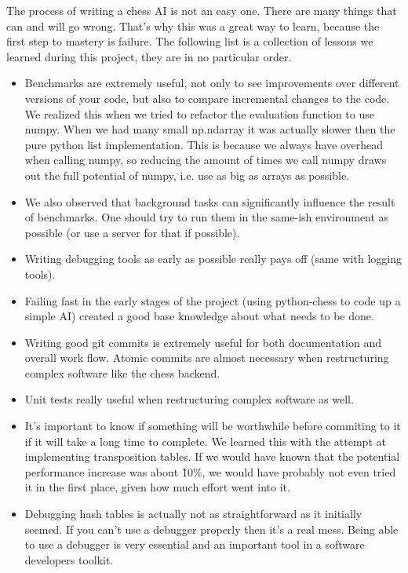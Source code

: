 The process of writing a chess AI is not an easy one.
There are many things that can and will go wrong.
That's why this was a great way to learn,
because the first step to mastery is failure.
The following list is a collection of lessons we learned during
this project, they are in no particular order.

\begin{itemize}
  \item{
Benchmarks are extremely useful,
not only to see improvements over different versions of your code,
but also to compare incremental changes to the code.
We realized this when we tried to refactor the evaluation function to use numpy.
When we had many small np.ndarray it was actually slower then the pure python list implementation.
This is because we always have overhead when calling numpy,
so reducing the amount of times we call numpy draws out the full potential of numpy,
i.e. use as big as arrays as possible.
}
  \item{
We also observed that background tasks can significantly influence the result of benchmarks.
One should try to run them in the same-ish environment as possible
(or use a server for that if possible).
}
  \item{
Writing debugging tools as early as possible really pays off (same with logging tools).
}
  \item{
Failing fast in the early stages of the project (using python-chess to code up a simple AI)
created a good base knowledge about what needs to be done.
}
  \item{
Writing good git commits is extremely useful for both documentation and overall work flow.
Atomic commits are almost necessary when restructuring complex software like the chess backend.
}
  \item{
Unit tests really useful when restructuring complex software as well.
}
  \item{
It's important to know if something will be worthwhile
before commiting to it if it will take a long time to complete.
We learned this with the attempt at implementing transposition tables.
If we would have known that the potential performance increase was about
\~10\%, we would have probably not even tried it in the first place,
given how much effort went into it.
}
  \item{
Debugging hash tables is actually not as straightforward as it initially seemed.
If you can't use a debugger properly then it's a real mess.
Being able to use a debugger is very essential
and an important tool in a software developers toolkit.
}
\end{itemize}
